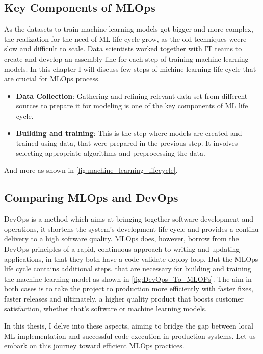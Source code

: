 \subsection{Key Components of MLOps}

As the datasets to train machine learning models got bigger and more complex, the realization for the need of \ac{ML} life cycle grow, as the old techniques weere slow and difficult to scale.
Data scientists worked together with IT teams to create and develop an assembly line for each step of training machine learning models.
In this chapter I will discuss few steps of michine learning life cycle that are crucial for \ac{MLOps} process.
\begin{itemize}
\item \textbf{Data Collection}: Gathering and refining relevant data set from different sources to prepare it for modeling is one of the key components of ML life cycle.
\item \textbf{Building and training}: This is the step  where models are created and trained using data, that were prepared in the previous step. It involves selecting appropriate algorithms and preprocessing the data.
\end{itemize}
And more as shown in \autoref{fig:machine_learning_lifecycle}.


\subsection{Comparing MLOps and DevOps}

DevOps is a method which aims at bringing together software development and operations, it shortens the system's development life cycle and provides a continu delivery to a high software quality. 
\newline
\ac{MLOps} does, however, borrow from the DevOps principles of a rapid, continuous approach to writing and updating applications, in that they both have a code-validate-deploy loop. But the \ac{MLOps} life cycle contains additional steps, that are necessary for building and training the machine learning model as shown in \autoref{fig:DevOps_To_MLOPs}.
The aim in both cases is to take the project to production more efficiently with faster fixes, faster releases and ultimately, a higher quality product that boosts customer satisfaction, whether that’s software or machine learning models.

\newline
In this thesis, I delve into these aspects, aiming to bridge the gap between local ML implementation and successful code execution in production systems. Let us embark on this journey toward efficient \ac{MLOps} practices.